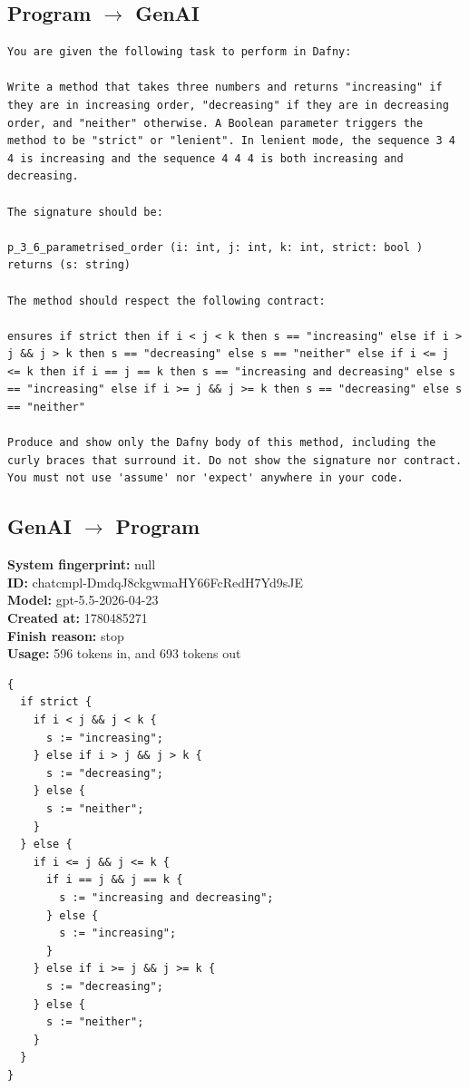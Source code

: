 \documentclass{article}
\begin{document}
\subsection*{Program $\rightarrow$ GenAI}
\begin{lstlisting}
You are given the following task to perform in Dafny:

Write a method that takes three numbers and returns "increasing" if they are in increasing order, "decreasing" if they are in decreasing order, and "neither" otherwise. A Boolean parameter triggers the method to be "strict" or "lenient". In lenient mode, the sequence 3 4 4 is increasing and the sequence 4 4 4 is both increasing and decreasing.

The signature should be:

p_3_6_parametrised_order (i: int, j: int, k: int, strict: bool ) returns (s: string)

The method should respect the following contract:

ensures if strict then if i < j < k then s == "increasing" else if i > j && j > k then s == "decreasing" else s == "neither" else if i <= j <= k then if i == j == k then s == "increasing and decreasing" else s == "increasing" else if i >= j && j >= k then s == "decreasing" else s == "neither"

Produce and show only the Dafny body of this method, including the curly braces that surround it. Do not show the signature nor contract. You must not use 'assume' nor 'expect' anywhere in your code.
\end{lstlisting}
\subsection*{GenAI $\rightarrow$ Program}
\textbf{System fingerprint: }null
\\\textbf{ID: }chatcmpl-DmdqJ8ckgwmaHY66FcRedH7Yd9sJE
\\\textbf{Model: }gpt-5.5-2026-04-23
\\\textbf{Created at: }1780485271
\\\textbf{Finish reason: }stop
\\\textbf{Usage: }596 tokens in, and 693 tokens out
\begin{lstlisting}
{
  if strict {
    if i < j && j < k {
      s := "increasing";
    } else if i > j && j > k {
      s := "decreasing";
    } else {
      s := "neither";
    }
  } else {
    if i <= j && j <= k {
      if i == j && j == k {
        s := "increasing and decreasing";
      } else {
        s := "increasing";
      }
    } else if i >= j && j >= k {
      s := "decreasing";
    } else {
      s := "neither";
    }
  }
}
\end{lstlisting}
\end{document}
